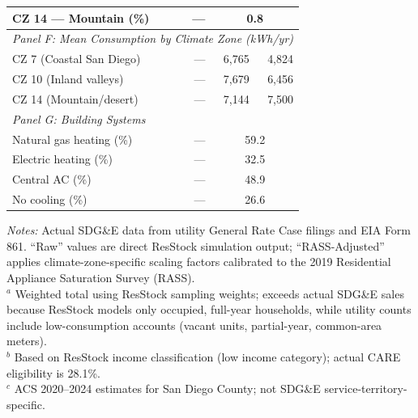 \begin{table}[htbp]
\begin{tabular}{lrrr}
CZ 14 --- Mountain (\%) & --- & \multicolumn{2}{c}{0.8} \\
\midrule
\multicolumn{4}{l}{\textit{Panel F: Mean Consumption by Climate Zone (kWh/yr)}} \\
CZ 7 (Coastal San Diego) & --- & 6,765 & 4,824 \\
CZ 10 (Inland valleys) & --- & 7,679 & 6,456 \\
CZ 14 (Mountain/desert) & --- & 7,144 & 7,500 \\
\midrule
\multicolumn{4}{l}{\textit{Panel G: Building Systems}} \\
Natural gas heating (\%) & --- & \multicolumn{2}{c}{59.2} \\
Electric heating (\%) & --- & \multicolumn{2}{c}{32.5} \\
Central AC (\%) & --- & \multicolumn{2}{c}{48.9} \\
No cooling (\%) & --- & \multicolumn{2}{c}{26.6} \\
\bottomrule
\end{tabular}
\begin{minipage}{\textwidth}
\vspace{0.3em}
\footnotesize
\textit{Notes:} Actual SDG\&E data from utility General Rate Case filings and EIA Form 861. ``Raw'' values are direct ResStock simulation output; ``RASS-Adjusted'' applies climate-zone-specific scaling factors calibrated to the 2019 Residential Appliance Saturation Survey (RASS). \\
$^a$ Weighted total using ResStock sampling weights; exceeds actual SDG\&E sales because ResStock models only occupied, full-year households, while utility counts include low-consumption accounts (vacant units, partial-year, common-area meters). \\
$^b$ Based on ResStock income classification (low income category); actual CARE eligibility is 28.1\%. \\
$^c$ ACS 2020--2024 estimates for San Diego County; not SDG\&E service-territory-specific.
\end{minipage}
\end{table}
